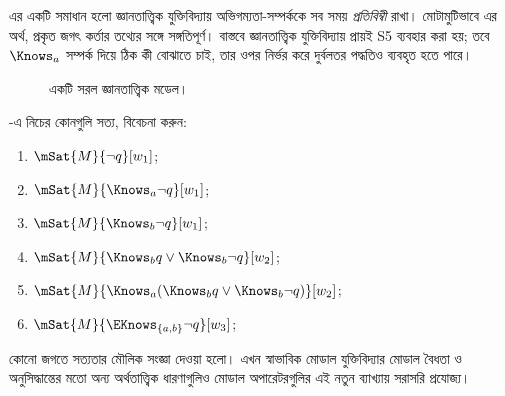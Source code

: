 \documentclass[../../../include/open-logic-section]{subfiles}
\begin{document}
এর একটি সমাধান হলো জ্ঞানতাত্ত্বিক যুক্তিবিদ্যায় অভিগম্যতা-সম্পর্ককে সব সময় \emph{প্রতিবিম্বী} রাখা। মোটামুটিভাবে এর অর্থ, প্রকৃত জগৎ কর্তার তথ্যের সঙ্গে সঙ্গতিপূর্ণ। বাস্তবে জ্ঞানতাত্ত্বিক যুক্তিবিদ্যায় প্রায়ই S5 ব্যবহার করা হয়; তবে $\Knows_a$ সম্পর্ক দিয়ে ঠিক কী বোঝাতে চাই, তার ওপর নির্ভর করে দুর্বলতর পদ্ধতিও ব্যবহৃত হতে পারে।

\begin{figure}
  \begin{center}
  \end{center}
  \caption{একটি সরল জ্ঞানতাত্ত্বিক মডেল।}
\end{figure}

\begin{prob}
  -এ নিচের কোনগুলি সত্য, বিবেচনা করুন:
  \begin{enumerate}
    \item $\mSat{M}{\lnot q}[w_1]$;
    \item $\mSat{M}{\Knows_a \lnot q}[w_1]$;
    \item $\mSat{M}{\Knows_b \lnot q}[w_1]$;
    \item $\mSat{M}{\Knows_b q \lor \Knows_b \lnot q}[w_2]$;
    \item $\mSat{M}{\Knows_a( \Knows_b q \lor \Knows_b \lnot q)}[w_2]$;
    \item $\mSat{M}{\EKnows_{\{a,b\}} \lnot q}[w_3]$;
    \end{enumerate}
\end{prob}

কোনো জগতে সত্যতার মৌলিক সংজ্ঞা দেওয়া হলো। এখন স্বাভাবিক মোডাল যুক্তিবিদ্যার মোডাল বৈধতা ও অনুসিদ্ধান্তের মতো অন্য অর্থতাত্ত্বিক ধারণাগুলিও মোডাল অপারেটরগুলির এই নতুন ব্যাখ্যায় সরাসরি প্রযোজ্য।
\end{document}
